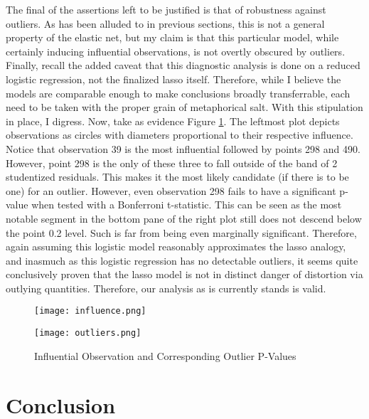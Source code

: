 \documentclass[11pt]{article}
\begin{document}
	The final of the assertions left to be justified is that of robustness against outliers.  As has been alluded to in previous sections, this is not a general property of the elastic net, but my claim is that this particular model, while certainly inducing influential observations, is not overtly obscured by outliers.  Finally, recall the added caveat that this diagnostic analysis is done on a reduced logistic regression, not the finalized lasso itself.  Therefore, while I believe the models are comparable enough to make conclusions broadly transferrable, each need to be taken with the proper grain of metaphorical salt.  With this stipulation in place, I digress.  Now, take as evidence Figure \ref{fig:out}.  The leftmost plot depicts observations as circles with diameters proportional to their respective influence.  Notice that observation 39 is the most influential followed by points 298 and 490.  However, point 298 is the only of these three to fall outside of the band of 2 studentized residuals.  This makes it the most likely candidate (if there is to be one) for an outlier.  However, even observation 298 fails to have a significant p-value when tested with a Bonferroni t-statistic.  This can be seen as the most notable segment in the bottom pane of the right plot still does not descend below the point 0.2 level.  Such is far from being even marginally significant.   Therefore, again assuming this logistic model reasonably approximates the lasso analogy, and inasmuch as this logistic regression has no detectable outliers, it seems quite conclusively proven that the lasso model is not in distinct danger of distortion via outlying quantities.  Therefore, our analysis as is currently stands is valid.  
	
	
	
	\begin{figure}[htbp]
\centering
\begin{minipage}{.5\textwidth}
	\centering
	\texttt{[image: influence.png]}
\end{minipage}%
\begin{minipage}{.5\textwidth}
	\centering
	\texttt{[image: outliers.png]}
\end{minipage}%
\caption{Influential Observation and Corresponding Outlier P-Values}\label{fig:out}
\end{figure}






\section{Conclusion}
\end{document}
